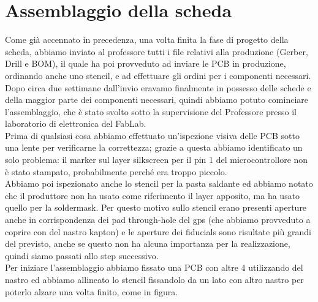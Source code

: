 \chapter{Assemblaggio della scheda}

Come già accennato in precedenza, una volta finita la fase di progetto della scheda, abbiamo 
inviato al professore tutti i file relativi alla produzione (Gerber, Drill e BOM), 
il quale ha poi provveduto ad inviare le PCB in produzione, ordinando anche uno 
stencil, e ad effettuare gli ordini per i componenti necessari.\\
Dopo circa due settimane dall’invio eravamo finalmente in possesso delle schede 
e della maggior parte dei componenti necessari, quindi abbiamo potuto cominciare 
l’assemblaggio, che è stato svolto sotto la supervisione del Professore presso 
il laboratorio di elettronica del FabLab.\\
Prima di qualsiasi cosa abbiamo effettuato un’ispezione visiva delle PCB sotto 
una lente per verificarne la correttezza; grazie a questa abbiamo identificato 
un solo problema: il marker sul layer silkscreen per il pin 1 del microcontrollore 
non è stato stampato, probabilmente perché era troppo piccolo.\\
Abbiamo poi ispezionato anche lo stencil per la pasta saldante ed abbiamo notato 
che il produttore non ha usato come riferimento il layer apposito, ma ha usato 
quello per la soldermask. Per questo motivo sullo stencil erano presenti aperture 
anche in corrispondenza dei pad through-hole del gps (che abbiamo provveduto a 
coprire con del nastro kapton) e le aperture dei fiducials sono risultate più 
grandi del previsto, anche se questo non ha alcuna importanza per la realizzazione, 
quindi siamo passati allo step successivo.\\
Per iniziare l’assemblaggio abbiamo fissato una PCB con altre 4 utilizzando del 
nastro ed abbiamo allineato lo stencil fissandolo da un lato con altro nastro per 
poterlo alzare una volta finito, come in figura.

